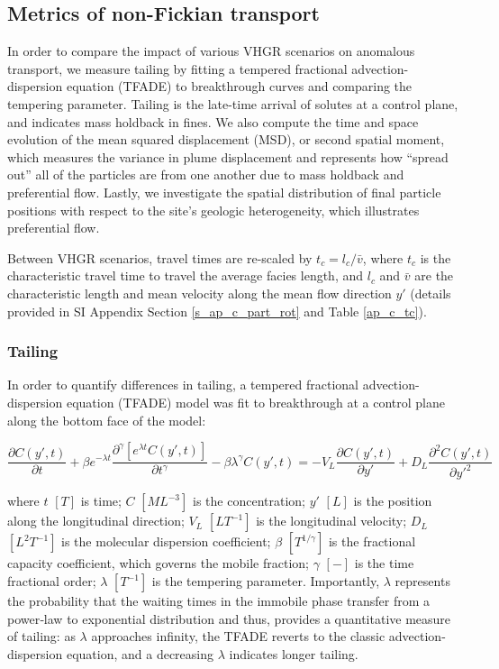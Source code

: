 %
%
\subsection{Metrics of non-Fickian transport}
\label{ss_2_5}

In order to compare the impact of various VHGR scenarios on anomalous transport, we measure tailing by fitting a tempered fractional advection-dispersion equation (TFADE) to breakthrough curves and comparing the tempering parameter. Tailing is the late-time arrival of solutes at a control plane, and indicates mass holdback in fines. We also compute the time and space evolution of the mean squared displacement (MSD), or second spatial moment, which measures the variance in plume displacement and represents how ``spread out'' all of the particles are from one another due to mass holdback and preferential flow. Lastly, we investigate the spatial distribution of final particle positions with respect to the site's geologic heterogeneity, which illustrates preferential flow.

Between VHGR scenarios, travel times are re-scaled by $t_c = l_c / \bar{v}$, where $t_c$ is the characteristic travel time to travel the average facies length, and $l_c$ and $\bar{v}$ are the characteristic length and mean velocity along the mean flow direction $y'$ (details provided in SI Appendix Section \ref{s_ap_c_part_rot} and Table \ref{ap_c_tc}). 


%
%
\subsubsection{Tailing}
\label{ss_tailing}

In order to quantify differences in tailing, a tempered fractional advection-dispersion equation (TFADE) model \citep{meerschaert2008tempered} was fit to breakthrough at a control plane along the bottom face of the model:

\begin{equation}
\label{eq:tfade}
    \frac{\partial C(y', t)}{\partial t}+\beta e^{-\lambda t} \frac{\partial^{\gamma}\left[e^{\lambda t} C(y', t)\right]}{\partial t^{\gamma}}-\beta \lambda^{\gamma} C(y', t)=-V_{L} \frac{\partial C(y', t)}{\partial y'}+D_{L} \frac{\partial^{2} C(y', t)}{\partial y'^{2}}
\end{equation}

where $t$ $[T]$ is time; $C$ $[ML^{-3}]$ is the concentration; $y'$ $[L]$ is the position along the longitudinal direction; $V_L$ $[LT^{-1}]$ is the longitudinal velocity; $D_L$ $[L^2T^{-1}]$ is the molecular dispersion coefficient; $\beta$ $[T^{1/ \gamma}]$ is the fractional capacity coefficient, which governs the mobile fraction; $\gamma$ $[-]$ is the time fractional order; $\lambda$ $[T^{-1}]$ is the tempering parameter. Importantly, $\lambda$ represents the probability that the waiting times in the immobile phase transfer from a power‐law to exponential distribution and thus, provides a quantitative measure of tailing: as $\lambda$ approaches infinity, the TFADE reverts to the classic advection-dispersion equation, and a decreasing $\lambda$ indicates longer tailing. 

